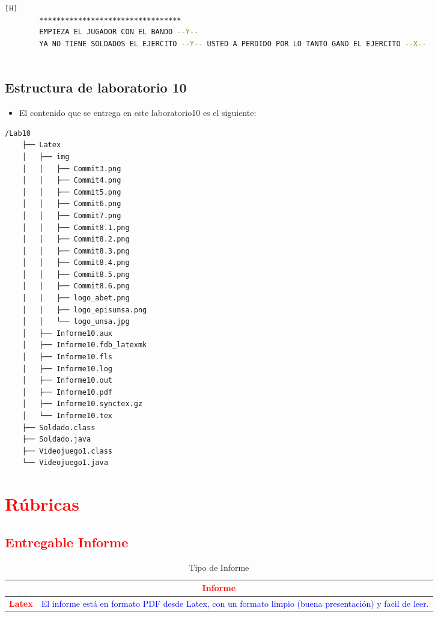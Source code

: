 \documentclass{article}
\begin{document}
	\begin{lstlisting}[language=bash,caption={Ejecucion:}][H]
		*********************************
		EMPIEZA EL JUGADOR CON EL BANDO --Y-- 
		YA NO TIENE SOLDADOS EL EJERCITO --Y-- USTED A PERDIDO POR LO TANTO GANO EL EJERCITO --X-- 
	   
	\end{lstlisting}	
	\subsection{Estructura de laboratorio 10}
	\begin{itemize}	
		\item El contenido que se entrega en este laboratorio10 es el siguiente:
	\end{itemize}
	\begin{lstlisting}[style=ascii-tree]
	/Lab10	
	├── Latex
	│   ├── img
	│   │   ├── Commit3.png
	│   │   ├── Commit4.png
	│   │   ├── Commit5.png
	│   │   ├── Commit6.png
	│   │   ├── Commit7.png
	│   │   ├── Commit8.1.png
	│   │   ├── Commit8.2.png
	│   │   ├── Commit8.3.png
	│   │   ├── Commit8.4.png
	│   │   ├── Commit8.5.png
	│   │   ├── Commit8.6.png
	│   │   ├── logo_abet.png
	│   │   ├── logo_episunsa.png
	│   │   └── logo_unsa.jpg
	│   ├── Informe10.aux
	│   ├── Informe10.fdb_latexmk
	│   ├── Informe10.fls
	│   ├── Informe10.log
	│   ├── Informe10.out
	│   ├── Informe10.pdf
	│   ├── Informe10.synctex.gz
	│   └── Informe10.tex
	├── Soldado.class
	├── Soldado.java
	├── Videojuego1.class
	└── Videojuego1.java

	\end{lstlisting}    
	\section{\textcolor{red}{Rúbricas}}
	
	\subsection{\textcolor{red}{Entregable Informe}}
	\begin{table}[H]
		\caption{Tipo de Informe}
		\setlength{\tabcolsep}{0.5em} %
		{\renewcommand{\arraystretch}{1.5}%
		\begin{tabular}{|p{3cm}|p{12cm}|}
			\hline
			\multicolumn{2}{|c|}{\textbf{\textcolor{red}{Informe}}}  \\
			\hline 
			\textbf{\textcolor{red}{Latex}} & \textcolor{blue}{El informe está en formato PDF desde Latex,  con un formato limpio (buena presentación) y facil de leer.}   \\ 
			\hline 
			
			
		\end{tabular}
	}
	\end{table}
	
\end{document}
